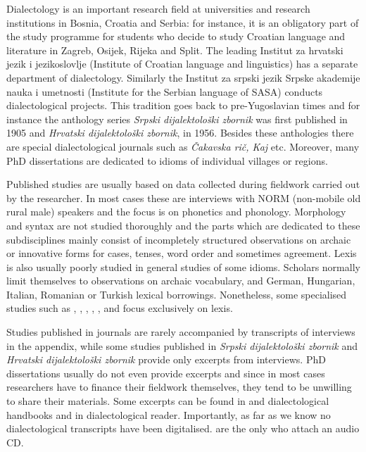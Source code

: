 Dialectology is an important research field at universities and research institutions in Bosnia, Croatia and Serbia: for instance, it is an obligatory part of the study programme for students who decide to study Croatian language and literature in Zagreb, Osijek, Rijeka and Split. The leading Institut za hrvatski jezik i jezikoslovlje (Institute of Croatian language and linguistics) has a separate department of dialectology. Similarly the Institut za srpski jezik Srpske akademije nauka i umetnosti (Institute for the Serbian language of SASA) conducts dialectological projects. This tradition goes back to pre-Yugoslavian times and for instance the anthology series \textit{Srpski dijalektološki zbornik} was first published in 1905 and \textit{Hrvatski dijalektološki zbornik}, in 1956. Besides these anthologies there are special dialectological journals such as \textit{Čakavska rič, Kaj} etc. Moreover, many PhD dissertations are dedicated to idioms of individual villages or regions. 

Published studies are usually based on data collected during fieldwork carried out by the researcher. In most cases these are interviews with NORM (non-mobile old rural male) speakers and the focus is on phonetics and phonology. Morphology and syntax are not studied thoroughly and the parts which are dedicated to these subdisciplines mainly consist of incompletely structured observations on archaic or innovative forms for cases, tenses, word order and sometimes agreement. Lexis is also usually poorly studied in general studies of some idioms. Scholars normally limit themselves to observations on archaic vocabulary, and German, Hungarian, Italian, Romanian or Turkish lexical borrowings. Nonetheless, some specialised studies such as \citet{Plotnikova97}, \citet{BozovicBascarevic05}, \citet{MLK18}, \citet{VuleticSkracic18}, \citet{Horvat18}, and \citet{Filipan13} focus exclusively on lexis. 

Studies published in journals are rarely accompanied by transcripts of interviews in the appendix, while some studies published in \textit{Srpski dijalektološki zbor\-nik} and \textit{Hrvatski dijalektološki zbornik} provide only excerpts from interviews. PhD dissertations usually do not even provide excerpts and since in most cases researchers have to finance their fieldwork themselves, they tend to be unwilling to share their materials. Some excerpts can be found in \citet{Lisac03, Lisac09} and \citet{Okuka08} dialectological handbooks and in \citet{MenacCelinic12} dialectological reader. Importantly, as far as we know no dialectological transcripts have been digitalised. \citet{MenacCelinic12} are the only who  attach an audio CD.

